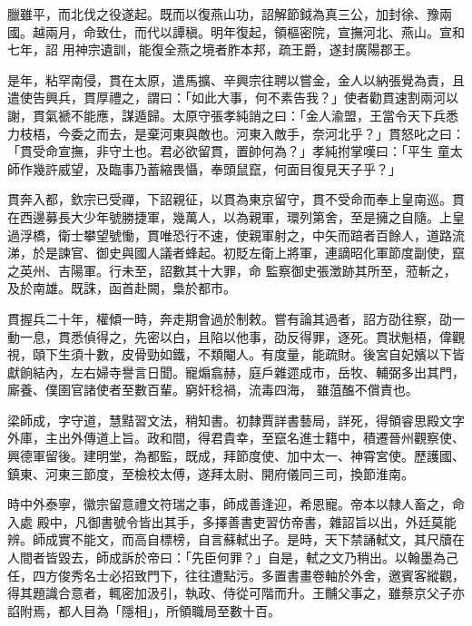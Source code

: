 \begin{pinyinscope}
 臘雖平，而北伐之役遂起。既而以復燕山功，詔解節鉞為真三公，加封徐、豫兩國。越兩月，命致仕，而代以譚稹。明年復起，領樞密院，宣撫河北、燕山。宣和七年，詔
 用神宗遺訓，能復全燕之境者胙本邦，疏王爵，遂封廣陽郡王。



 是年，粘罕南侵，貫在太原，遣馬擴、辛興宗往聘以嘗金，金人以納張覺為責，且遣使告興兵，貫厚禮之，謂曰：「如此大事，何不素告我？」使者勸貫速割兩河以謝，貫氣褫不能應，謀遁歸。太原守張孝純誚之曰：「金人渝盟，王當令天下兵悉力枝梧，今委之而去，是棄河東與敵也。河東入敵手，奈河北乎？」貫怒叱之曰：「貫受命宣撫，非守土也。君必欲留貫，置帥何為？」孝純拊掌嘆曰：「平生
 童太師作幾許威望，及臨事乃蓄縮畏懾，奉頭鼠竄，何面目復見天子乎？」



 貫奔入都，欽宗已受禪，下詔親征，以貫為東京留守，貫不受命而奉上皇南巡。貫在西邊募長大少年號勝捷軍，幾萬人，以為親軍，環列第舍，至是擁之自隨。上皇過浮橋，衛士攀望號慟，貫唯恐行不速，使親軍射之，中矢而踣者百餘人，道路流涕，於是諫官、御史與國人議者蜂起。初貶左衛上將軍，連謫昭化軍節度副使，竄之英州、吉陽軍。行未至，詔數其十大罪，命
 監察御史張澂跡其所至，蒞斬之，及於南雄。既誅，函首赴闕，梟於都市。



 貫握兵二十年，權傾一時，奔走期會過於制敕。嘗有論其過者，詔方劭往察，劭一動一息，貫悉偵得之，先密以白，且陷以他事，劭反得罪，逐死。貫狀魁梧，偉觀視，頤下生須十數，皮骨勁如鐵，不類閹人。有度量，能疏財。後宮自妃嬪以下皆獻餉結內，左右婦寺譽言日聞。寵煽翕赫，庭戶雜遝成市，岳牧、輔弼多出其門，廝養、僕圉官諸使者至數百輩。窮奸稔禍，流毒四海，
 雖菹醢不償責也。



 梁師成，字守道，慧黠習文法，稍知書。初隸賈詳書藝局，詳死，得領睿思殿文字外庫，主出外傳道上旨。政和間，得君貴幸，至竄名進士籍中，積遷晉州觀察使、興德軍留後。建明堂，為都監，既成，拜節度使、加中太一、神霄宮使。歷護國、鎮東、河東三節度，至檢校太傅，遂拜太尉、開府儀同三司，換節淮南。



 時中外泰寧，徽宗留意禮文符瑞之事，師成善逢迎，希恩寵。帝本以隸人畜之，命入處
 殿中，凡御書號令皆出其手，多擇善書吏習仿帝書，雜詔旨以出，外廷莫能辨。師成實不能文，而高自標榜，自言蘇軾出子。是時，天下禁誦軾文，其尺牘在人間者皆毀去，師成訴於帝曰：「先臣何罪？」自是，軾之文乃稍出。以翰墨為己任，四方俊秀名士必招致門下，往往遭點污。多置書畫卷軸於外舍，邀賓客縱觀，得其題識合意者，輒密加汲引，執政、侍從可階而升。王黼父事之，雖蔡京父子亦諂附焉，都人目為「隱相」，所領職局至數十百。




\end{pinyinscope}
